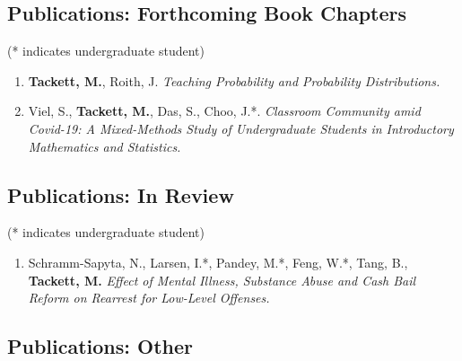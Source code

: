 \documentclass[11pt,dvipsnames]{article}
\providecommand{\tightlist}{%
  \setlength{\itemsep}{0pt}\setlength{\parskip}{0pt}}
\begin{document}
\subsection{Publications: Forthcoming Book
Chapters}\label{publications-forthcoming-book-chapters}

(* indicates undergraduate student)

\begin{enumerate}
\def\labelenumi{\arabic{enumi}.}
\setcounter{enumi}{8}
\item
  \textbf{Tackett, M.}, Roith, J. \emph{Teaching Probability and
  Probability Distributions.}
\item
  Viel, S., \textbf{Tackett, M.}, Das, S., Choo, J.*. \emph{Classroom
  Community amid Covid-19: A Mixed-Methods Study of Undergraduate
  Students in Introductory Mathematics and Statistics.}
\end{enumerate}

\subsection{Publications: In Review}\label{publications-in-review}

(* indicates undergraduate student)

\begin{enumerate}
\def\labelenumi{\arabic{enumi}.}
\setcounter{enumi}{10}
\tightlist
\item
  Schramm-Sapyta, N., Larsen, I.*, Pandey, M.*, Feng, W.*, Tang, B.,
  \textbf{Tackett, M.} \emph{Effect of Mental Illness, Substance Abuse
  and Cash Bail Reform on Rearrest for Low-Level Offenses.}
\end{enumerate}

\subsection{Publications: Other}\label{publications-other}
\end{document}
